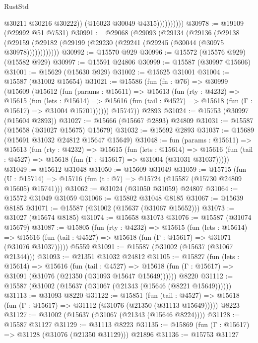 \begin{lexlean}{RustStd}
\begin{coremodule}
                          @30211
                          @30216
                          @30222))
                      (@16023 @30049 @4315))))))))))
@30978 := @19109 (@29992 @51 @7531)
@30991 := @29068
    (@29093
      (@29134
        (@29136
          (@29138 (@29159 (@29182 (@29199 (@29230 (@29241 (@29245 (@30044 (@30975 @30978))))))))))))
@30992 := @15570 @929
@30996 := @15572 (@15576 @929) (@15582 @929)
@30997 := @15591 @24806
@30999 := @15587 (@30997 @15606)
@31001 := @15629 (@15630 @929)
@31002 := @15625 @31001
@31004 := @15587 (@31002 @15654)
@31021 := @15586
    (fun (fn : @76) =>
    @30999
      (@15609
        (@15612
          (fun (params : @15611) =>
          @15613
            (fun (rty : @4232) =>
            @15615
              (fun (lets : @15614) =>
              @15616 (fun (tail : @4527) => @15618 (fun (Γ : @15617) => @31004 @15701))))))
        @15747))
    @2893
@31024 := @15753 (@30997 (@15604 @2893))
@31027 := @15666 (@15667 @2893) @24809
@31031 := @15587 (@15658 (@31027 @15675) @15679)
@31032 := @15692 @2893
@31037 := @15689 (@15691 @31032 @24812 @15647 @15649)
@31048 := fun (params : @15611) =>
  @15613
    (fun (rty : @4232) =>
    @15615
      (fun (lets : @15614) =>
      @15616 (fun (tail : @4527) => @15618 (fun (Γ : @15617) => @31004 (@31031 @31037)))))
@31049 := @15612 @31048
@31050 := @15609 @31049
@31059 := @15715
    (fun (U : @15714) => @15716 (fun (t : @7) => @15724 (@15587 (@15730 @24809 @15605) @15741)))
@31062 := @31024 (@31050 @31059) @24807
@31064 := @15572 @31049 @31059
@31066 := @15802 @31048 @8185
@31067 := @15639 @8185
@31071 := @15587 (@31002 (@15637 (@31067 @15652)))
@31073 := @31027 (@15674 @8185)
@31074 := @15658 @31073
@31076 := @15587 (@31074 @15679)
@31087 := @15805
    (fun (rty : @4232) =>
    @15615
      (fun (lets : @15614) =>
      @15616 (fun (tail : @4527) => @15618 (fun (Γ : @15617) => @31071 (@31076 @31037)))))
    @5559
@31091 := @15587 (@31002 (@15637 (@31067 @21344)))
@31093 := @21351 @31032 @24812
@31105 := @15827
    (fun (lets : @15614) =>
    @15616
      (fun (tail : @4527) =>
      @15618 (fun (Γ : @15617) => @31091 (@31076 (@21350 (@31093 @15647 @15649))))))
    @8220
@31112 := @15587 (@31002 (@15637 (@31067 (@21343 (@15646 (@8221 @15649))))))
@31113 := @31093 @8220
@31122 := @15851
    (fun (tail : @4527) => @15618 (fun (Γ : @15617) => @31112 (@31076 (@21350 (@31113 @15649)))))
    @8223
@31127 := @31002 (@15637 (@31067 (@21343 (@15646 @8224))))
@31128 := @15587 @31127
@31129 := @31113 @8223
@31135 := @15869 (fun (Γ : @15617) => @31128 (@31076 (@21350 @31129))) @21896
@31136 := @15753 @31127

\end{coremodule}
\end{lexlean}
